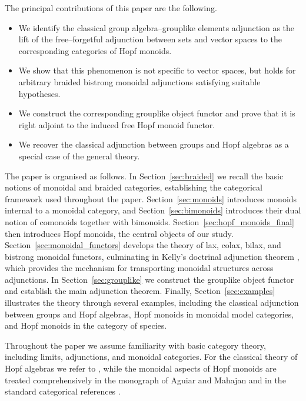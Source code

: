 \documentclass{amsart}
\begin{document}
The principal contributions of this paper are the following.
\begin{itemize}
    \item We identify the classical group algebra--grouplike elements adjunction as the lift of the free--forgetful adjunction between sets and vector spaces to the corresponding categories of Hopf monoids.
    \item We show that this phenomenon is not specific to vector spaces, but holds for arbitrary braided bistrong monoidal adjunctions satisfying suitable hypotheses.
    \item We construct the corresponding grouplike object functor and prove that it is right adjoint to the induced free Hopf monoid functor.
    \item We recover the classical adjunction between groups and Hopf algebras as a special case of the general theory.
\end{itemize}

The paper is organised as follows. In Section~\ref{sec:braided} we recall the basic notions of monoidal and braided categories, establishing the categorical framework used throughout the paper. Section~\ref{sec:monoids} introduces monoids internal to a monoidal category, and Section~\ref{sec:bimonoids} introduces their dual notion of comonoids together with bimonoids. Section~\ref{sec:hopf_monoids_final} then introduces Hopf monoids, the central objects of our study. Section~\ref{sec:monoidal_functors} develops the theory of lax, colax, bilax, and bistrong monoidal functors, culminating in Kelly's doctrinal adjunction theorem \cite{DA}, which provides the mechanism for transporting monoidal structures across adjunctions. In Section~\ref{sec:grouplike} we construct the grouplike object functor and establish the main adjunction theorem. Finally, Section~\ref{sec:examples} illustrates the theory through several examples, including the classical adjunction between groups and Hopf algebras, Hopf monoids in monoidal model categories, and Hopf monoids in the category of species.

Throughout the paper we assume familiarity with basic category theory, including limits, adjunctions, and monoidal categories. For the classical theory of Hopf algebras we refer to \cite{Sweedler,Abe}, while the monoidal aspects of Hopf monoids are treated comprehensively in the monograph of Aguiar and Mahajan \cite{MF} and in the standard categorical references \cite{borceux1994handbook}.
\end{document}
